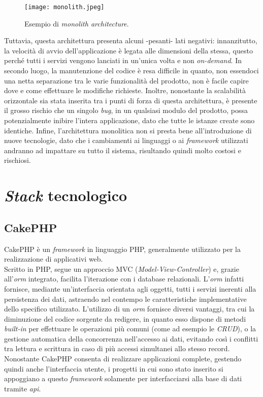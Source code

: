 \begin{figure}[h]
\texttt{[image: monolith.jpeg]}
\centering
\caption{Esempio di \textit{monolith architecture}.}
\label{fig:monolith}
\end{figure}

Tuttavia, questa architettura presenta alcuni -pesanti- lati negativi: innanzitutto, la velocità di avvio dell'applicazione è legata alle dimensioni della stessa, questo perché tutti i servizi vengono lanciati in un'unica volta e non \textit{on-demand}. In secondo luogo, la manutenzione del codice è resa difficile in quanto, non essendoci una netta separazione tra le varie funzionalità del prodotto, non è facile capire dove e come effettuare le modifiche richieste. Inoltre, nonostante la scalabilità orizzontale sia stata inserita tra i punti di forza di questa architettura, è presente il grosso rischio che un singolo \textit{bug}, in un qualsiasi modulo del prodotto, possa potenzialmente inibire l'intera applicazione, dato che tutte le istanze create sono identiche.
Infine, l'architettura monolitica non si presta bene all'introduzione di nuove tecnologie, dato che i cambiamenti ai linguaggi o ai \textit{\gls{framework}} utilizzati andranno ad impattare su tutto il sistema, risultando quindi molto costosi e rischiosi.

\section{\textit{Stack} tecnologico}
\subsection{CakePHP}
CakePHP è un \textit{\gls{framework}} in linguaggio PHP, generalmente utilizzato per la realizzazione di applicativi web.\\
Scritto in PHP, segue un approccio MVC (\textit{Model-View-Controller}) e, grazie all'\textit{\acrshort{orm}} integrato, facilita l'iterazione con i database relazionali. L'\textit{\acrshort{orm}} infatti fornisce, mediante un'interfaccia orientata agli oggetti, tutti i servizi inerenti alla persistenza dei dati, astraendo nel contempo le caratteristiche implementative dello specifico  utilizzato. L'utilizzo di un \textit{\acrshort{orm}} fornisce diversi vantaggi, tra cui la diminuzione del codice sorgente da redigere, in quanto esso dispone di metodi \textit{built-in} per effettuare le operazioni più comuni (come ad esempio le \textit{CRUD}), o la gestione automatica della concorrenza nell'accesso ai dati, evitando così i conflitti tra lettura e scrittura in caso di più accessi simultanei allo stesso record.\\
Nonostante CakePHP consenta di realizzare applicazioni complete, gestendo quindi anche l'interfaccia utente, i progetti in cui sono stato inserito si appoggiano a questo \textit{\gls{framework}} solamente per interfacciarsi alla base di dati tramite \textit{\acrshort{api}}.

